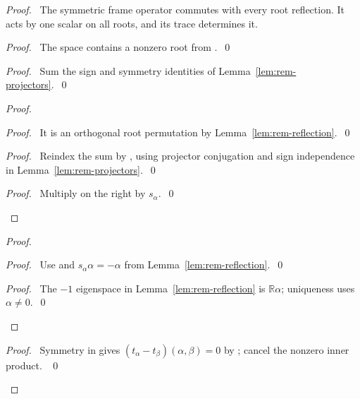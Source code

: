 \begin{proof}
\pfsketch\ The symmetric frame operator commutes with every root
reflection. It acts by one scalar on all roots, and its trace determines it.
\begin{proof}\pf\ The space contains a nonzero root from .~\qed\end{proof}
\begin{proof}\pf\ Sum the sign and symmetry identities of
Lemma~\ref{lem:rem-projectors}.~\qed\end{proof}
\begin{proof}
\begin{proof}\pf\ It is an orthogonal root permutation by
Lemma~\ref{lem:rem-reflection}.~\qed\end{proof}
\begin{proof}\pf\ Reindex the sum by , using
projector conjugation and sign independence in Lemma~\ref{lem:rem-projectors}.~\qed\end{proof}
\qedstep
\begin{proof}\pf\ Multiply  on the right by
$s_\alpha$.~\qed\end{proof}
\end{proof}
\begin{proof}
\begin{proof}\pf\ Use  and
$s_\alpha\alpha=-\alpha$ from Lemma~\ref{lem:rem-reflection}.~\qed\end{proof}
\qedstep
\begin{proof}\pf\ The $-1$ eigenspace in
Lemma~\ref{lem:rem-reflection} is $\mathbb R\alpha$; uniqueness uses
$\alpha\ne0$.~\qed\end{proof}
\end{proof}
\begin{proof}\pf\ Symmetry in  gives
$(t_\alpha-t_\beta)(\alpha,\beta)=0$ by ;
cancel the nonzero inner product. ~\qed\end{proof}

\end{proof}
